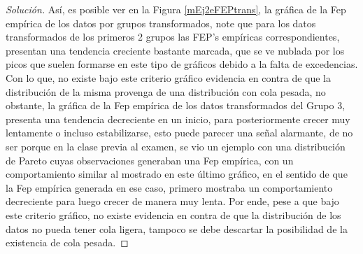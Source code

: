 \documentclass[10.5pt,notitlepage]{article}
\newenvironment{solucion}
  {\begin{proof}[Solución]}
  {\end{proof}}
\theoremstyle{plain}
\begin{document}
\begin{solucion}
Así, es posible ver en la Figura \ref{mEj2eFEPtrans}, la gráfica de la Fep empírica de los datos por grupos transformados, note que para los datos transformados de los primeros 2 grupos las FEP's empíricas correspondientes, presentan una tendencia creciente bastante marcada, que se ve nublada por los picos que suelen formarse en este tipo de gráficos debido a la falta de excedencias. Con lo que, no existe bajo este criterio gráfico evidencia en contra de que la distribución de la misma provenga de una distribución con cola pesada, no obstante, la gráfica de la Fep empírica de los datos transformados del Grupo 3, presenta una tendencia decreciente en un inicio, para posteriormente crecer muy lentamente o incluso estabilizarse, esto puede parecer una señal alarmante, de no ser porque en la clase previa al examen, se vio un ejemplo con una distribución de Pareto cuyas observaciones generaban una Fep empírica, con un comportamiento similar al mostrado en este último gráfico, en el sentido de que la Fep empírica generada en ese caso, primero mostraba un comportamiento decreciente para luego crecer de manera muy lenta. Por ende, pese a que bajo este criterio gráfico, no existe evidencia en contra de que la distribución de los datos no pueda tener cola ligera, tampoco se debe descartar la posibilidad de la existencia de cola pesada.  


\end{solucion}
\end{document}
